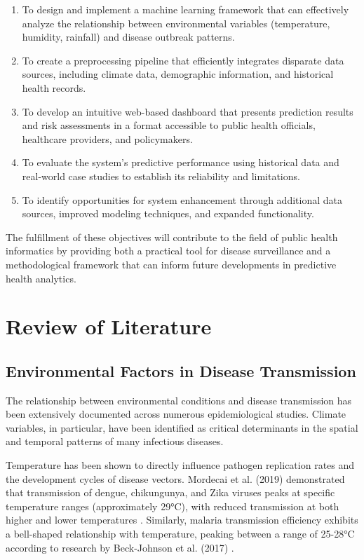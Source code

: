 \documentclass[12pt,a4paper]{report}
\begin{document}
\begin{enumerate}
    \item To design and implement a machine learning framework that can effectively analyze the relationship between environmental variables (temperature, humidity, rainfall) and disease outbreak patterns.
    
    \item To create a preprocessing pipeline that efficiently integrates disparate data sources, including climate data, demographic information, and historical health records.
    
    \item To develop an intuitive web-based dashboard that presents prediction results and risk assessments in a format accessible to public health officials, healthcare providers, and policymakers.
    
    \item To evaluate the system's predictive performance using historical data and real-world case studies to establish its reliability and limitations.
    
    \item To identify opportunities for system enhancement through additional data sources, improved modeling techniques, and expanded functionality.
\end{enumerate}

The fulfillment of these objectives will contribute to the field of public health informatics by providing both a practical tool for disease surveillance and a methodological framework that can inform future developments in predictive health analytics.

\chapter{Review of Literature}
\section{Environmental Factors in Disease Transmission}
The relationship between environmental conditions and disease transmission has been extensively documented across numerous epidemiological studies. Climate variables, in particular, have been identified as critical determinants in the spatial and temporal patterns of many infectious diseases.

Temperature has been shown to directly influence pathogen replication rates and the development cycles of disease vectors. Mordecai et al. (2019) demonstrated that transmission of dengue, chikungunya, and Zika viruses peaks at specific temperature ranges (approximately 29°C), with reduced transmission at both higher and lower temperatures \cite{mordecai2019thermal}. Similarly, malaria transmission efficiency exhibits a bell-shaped relationship with temperature, peaking between a range of 25-28°C according to research by Beck-Johnson et al. (2017) \cite{beck2017effect}.
\end{document}
